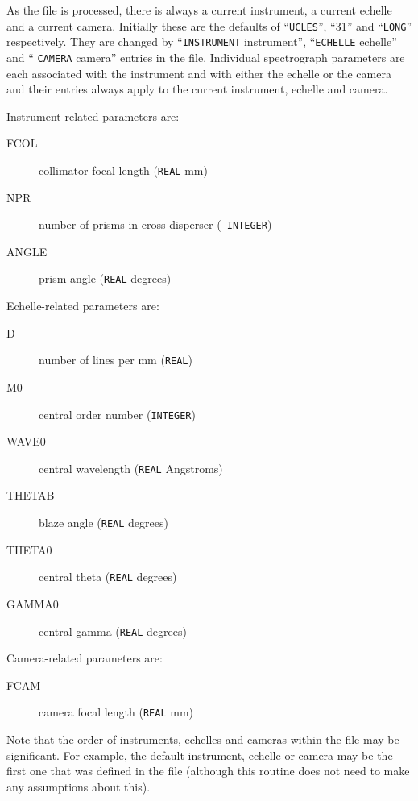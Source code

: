 \documentclass[11pt,twoside,noabs,nolof]{starlink}
\newcommand{\mantt}[1]{\texttt{#1}}
\newenvironment{mandescription}{\begin{description}}{\end{description}}
\newcommand{\mandescriptionitem}[1]{\item [#1]}
\begin{document}
     As the file is processed, there is always a current instrument, a current
     echelle and a current camera. Initially these are the defaults of
     ``{\mantt{UCLES}}'', ``31'' and ``{\mantt{LONG}}'' respectively. They are %
changed by
     ``{\mantt{INSTRUMENT}} instrument'', ``{\mantt{ECHELLE}} echelle'' and ``{%
\mantt{CAMERA}} camera'' entries in
     the file. Individual spectrograph parameters are each associated with the
     instrument and with either the echelle or the camera and their entries
     always apply to the current instrument, echelle and camera.

     Instrument-related parameters are:

\begin{mandescription}
\mandescriptionitem {FCOL}   collimator focal length ({\mantt{REAL}} mm)
\mandescriptionitem {NPR}    number of prisms in cross-disperser ({\mantt{%
INTEGER}})
\mandescriptionitem {ANGLE}  prism angle ({\mantt{REAL}} degrees)

\end{mandescription}
     Echelle-related parameters are:

\begin{mandescription}
\mandescriptionitem {D}      number of lines per mm ({\mantt{REAL}})
\mandescriptionitem {M0}     central order number ({\mantt{INTEGER}})
\mandescriptionitem {WAVE0}  central wavelength ({\mantt{REAL}} Angstroms)
\mandescriptionitem {THETAB} blaze angle ({\mantt{REAL}} degrees)
\mandescriptionitem {THETA0} central theta ({\mantt{REAL}} degrees)
\mandescriptionitem {GAMMA0} central gamma ({\mantt{REAL}} degrees)

\end{mandescription}
     Camera-related parameters are:

\begin{mandescription}
\mandescriptionitem {FCAM}   camera focal length ({\mantt{REAL}} mm)

\end{mandescription}
     Note that the order of instruments, echelles and cameras within the
     file may be significant. For example, the default instrument, echelle
     or camera may be the first one that was defined in the file (although
     this routine does not need to make any assumptions about this).
\end{document}
